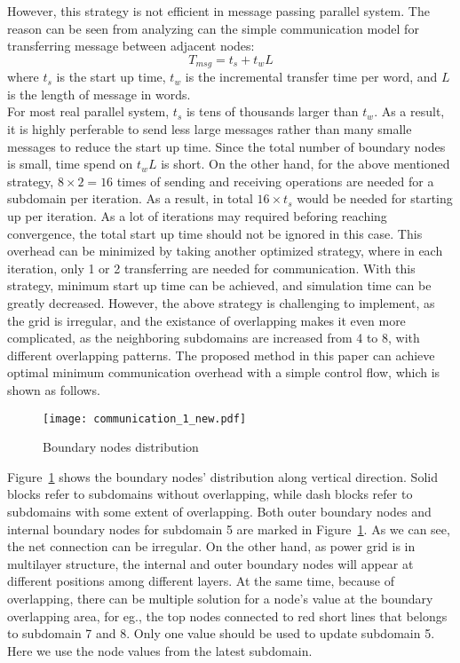 \documentclass{sig-alternate}
\begin{document}
 	However, this strategy is not efficient in message passing parallel system. The reason can be seen from analyzing can the simple
	communication model for transferring message between adjacent nodes:
	\begin{equation}
		T_{msg} = t_s + t_wL\label{eq_msg}
	\end{equation}
	where $t_s$ is the start up time, $t_w$ is the incremental transfer time per word, and $L$ is the length of message in words.\\
	
	For most real parallel system, $t_s$ is tens of thousands larger than $t_w$. As a result, it is highly perferable to send less 
	large messages rather than many smalle messages to reduce the start up time. Since the total number of boundary nodes is small, 
	time spend on $t_wL$ is short. On the other hand, for the above mentioned strategy, $8\times 2 = 
	16$ times of sending and receiving operations are needed for a subdomain per iteration. As a result, in total $16\times t_s$ 
	would be needed for starting up per iteration. As a lot of iterations may required beforing reaching convergence, the total 
	start up time should not be ignored in this case. This overhead can be minimized by taking another optimized strategy, where
	in each iteration, only 1 or 2 transferring are needed for communication. With this strategy, minimum start up time can be 
	achieved, and simulation time can be greatly decreased. However, the above strategy is challenging to implement, as the grid
	is irregular, and the existance of overlapping makes it even more complicated, as the neighboring subdomains are increased from
	4 to 8, with different overlapping patterns. The proposed method in this paper can achieve optimal minimum communication 
	overhead with a simple control flow, which is shown as follows.\\

	\begin{figure}[htbp]
	  \centering
	  \texttt{[image: communication\_1\_new.pdf]}
	  \caption{Boundary nodes distribution}
	  \label{comm}
	\end{figure}

	Figure~\ref{comm} shows the boundary nodes' distribution along vertical direction. Solid blocks refer to subdomains without 
	overlapping, while dash blocks refer to subdomains with some extent of overlapping. Both outer boundary nodes and internal
	boundary nodes for subdomain 5 are marked in Figure~\ref{comm}. As we can see, the net connection can be irregular. On the
	other hand, as power grid is in multilayer structure, the internal and outer boundary nodes will appear at different positions
	among different layers. At the
	same time, because of overlapping, there can be multiple solution for a node's value at the boundary overlapping area, for eg.,
	the top nodes connected to red short lines that belongs to subdomain 7 and 8. Only one value should be used to 
	update subdomain 5. Here we use the node values from the latest subdomain.\\
\end{document}

